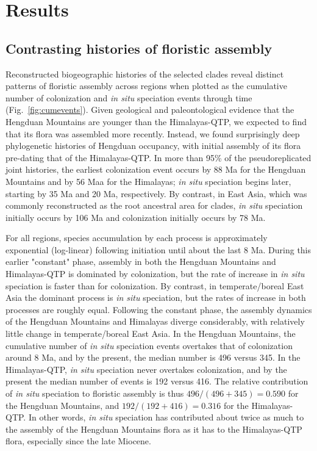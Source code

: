 \section{Results}

\subsection{Contrasting histories of floristic assembly}

Reconstructed biogeographic histories of the selected clades reveal distinct patterns of floristic assembly across regions when plotted as the cumulative number of colonization and \textit{in situ} speciation events through time (Fig.~\ref{fig:cumevents}). Given geological and paleontological evidence that the Hengduan Mountains are younger than the Himalayas-QTP, we expected to find that its flora was assembled more recently. Instead, we found surprisingly deep phylogenetic histories of Hengduan occupancy, with initial assembly of its flora pre-dating that of the Himalayas-QTP. In more than 95\% of the pseudoreplicated joint histories, the earliest colonization event occurs by 88 Ma for the Hengduan Mountains and by 56 Maa for the Himalayas; \textit{in situ} speciation begins later, starting by 35 Ma and 20 Ma, respectively. By contrast, in East Asia, which was commonly reconstructed as the root ancestral area for clades, \textit{in situ} speciation initially occurs by 106 Ma and colonization initially occurs by 78 Ma.

For all regions, species accumulation by each process is approximately exponential (log-linear) following initiation until about the last 8 Ma. During this earlier "constant" phase, assembly in both the Hengduan Mountains and Himalayas-QTP is dominated by colonization, but the rate of increase in \textit{in situ} speciation is faster than for colonization. By contrast, in temperate/boreal East Asia the dominant process is \textit{in situ} speciation, but the rates of increase in both processes are roughly equal. Following the constant phase, the assembly dynamics of the Hengduan Mountains and Himalayas diverge considerably, with relatively little change in temperate/boreal East Asia. In the Hengduan Mountains, the cumulative number of \textit{in situ} speciation events overtakes that of colonization around 8 Ma, and by the present, the median number is 496 versus 345. In the Himalayas-QTP, \textit{in situ} speciation never overtakes colonization, and by the present the median number of events is 192 versus 416. The relative contribution of \textit{in situ} speciation to floristic assembly is thus $496/(496+345) = 0.590$ for the Hengduan Mountains, and $192/(192+416) = 0.316$ for the Himalayas-QTP. In other words, \textit{in situ} speciation has contributed about twice as much to the assembly of the Hengduan Mountains flora as it has to the Himalayas-QTP flora, especially since the late Miocene.

